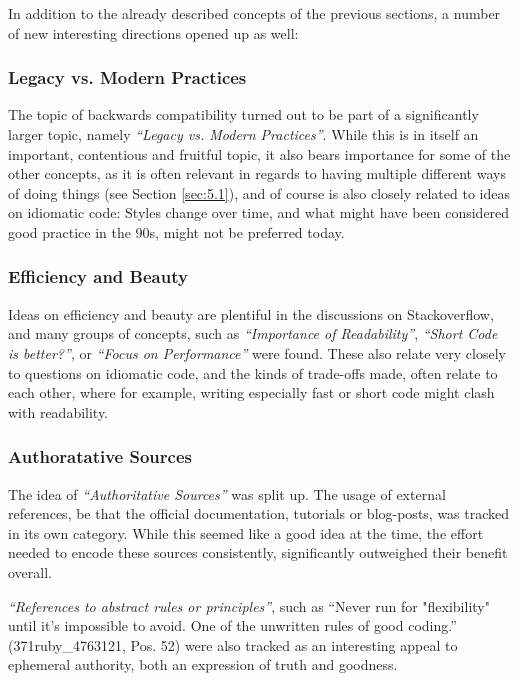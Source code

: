 In addition to the already described concepts of the previous sections, a number of new interesting directions
opened up as well:

\subsubsection{Legacy vs. Modern Practices}

The topic of backwards compatibility turned out to be part of a significantly larger topic, namely \textit{“Legacy vs. Modern Practices”}.
While this is in itself an important, contentious and fruitful topic, it also bears importance for some of the other
concepts, as it is often relevant in regards to having multiple different ways of doing things (see Section \ref{sec:5.1}),
and of course is also closely related to ideas on idiomatic code: Styles change over time, and what might have been
considered good practice in the 90s, might not be preferred today.

\subsubsection{Efficiency and Beauty}

Ideas on efficiency and beauty are plentiful in the discussions on Stackoverflow, and many groups of concepts, such as
\textit{“Importance of Readability”}, \textit{“Short Code is better?”}, or \textit{“Focus on Performance”} were found.
These also relate very  closely to questions on idiomatic code, and the kinds of trade-offs made, often relate to each other,
where for example, writing especially fast or short code might clash with readability.

\subsubsection{Authoratative Sources}

The idea of \textit{“Authoritative Sources”} was split up. The usage of external references, be that the official documentation,
tutorials or blog-posts, was tracked in its own category. While this seemed like a good idea at the time, the effort
needed to encode these sources consistently, significantly outweighed their benefit overall.

\textit{“References to abstract rules or principles”}, such as “Never run for "flexibility" until it's impossible to avoid.
One of the unwritten rules of good coding.” (371ruby\_4763121, Pos. 52) were also tracked as an interesting appeal
to ephemeral authority, both an expression of truth and goodness.

